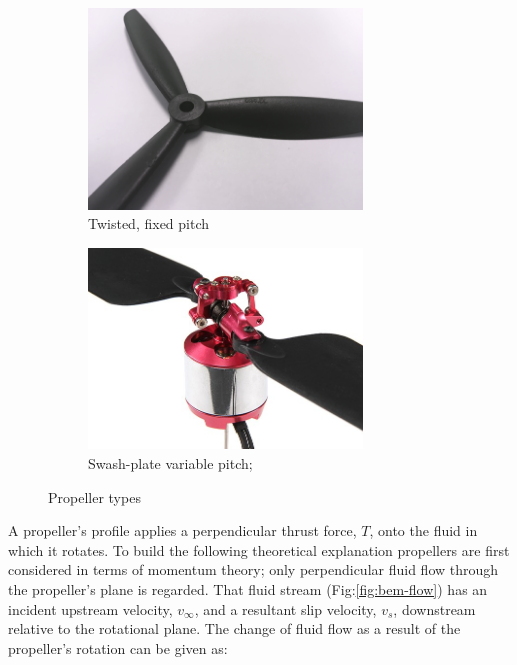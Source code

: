 \begin{figure}[htbp]
\centering
\begin{subfigure}{0.49\textwidth}
\centering
\includegraphics[width=0.8\textwidth]{figs/fixed-pitch}
\caption{Twisted, fixed pitch}
\label{fig:fixed-pitch}
\end{subfigure}
\begin{subfigure}{0.49\textwidth}
\centering
\includegraphics[width=0.8\textwidth]{figs/variable-pitch}
\caption{Swash-plate variable pitch; \cite{variablepitch}}
\label{fig:variable-pitch}
\end{subfigure}
\vspace{-6pt}
\caption{Propeller types}
\label{fig:props}
\vspace{-18pt}
\end{figure}
\par
A propeller's profile applies a perpendicular thrust force, $T$, onto the fluid in which it rotates. To build the following theoretical explanation propellers are first considered in terms of momentum theory; only perpendicular fluid flow through the propeller's plane is regarded. That fluid stream (Fig:\ref{fig:bem-flow}) has an incident upstream velocity, $v_\infty$, and a resultant slip velocity, $v_s$, downstream relative to the rotational plane. The change of fluid flow as a result of the propeller's rotation can be given as:
